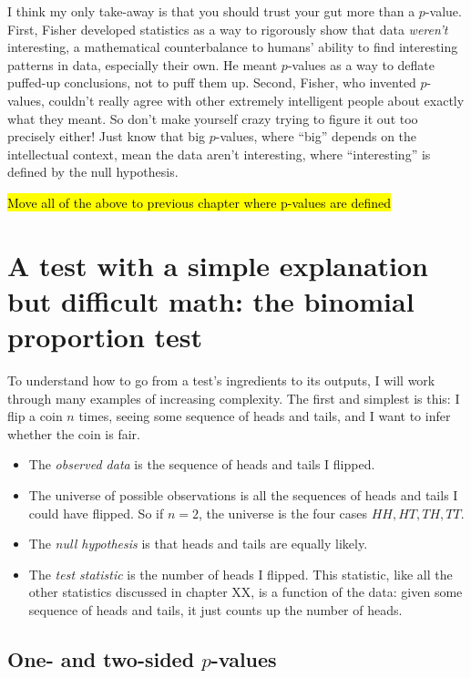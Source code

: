 I think my only take-away is that you should trust your gut more than a $p$-value. First, Fisher developed statistics as a way to rigorously show that data \emph{weren't} interesting, a mathematical counterbalance to humans' ability to find interesting patterns in data, especially their own. He meant $p$-values as a way to deflate puffed-up conclusions, not to puff them up. Second, Fisher, who invented $p$-values, couldn't really agree with other extremely intelligent people about exactly what they meant. So don't make yourself crazy trying to figure it out too precisely either! Just know that big $p$-values, where ``big'' depends on the intellectual context, mean the data aren't interesting, where ``interesting'' is defined by the null hypothesis.

\hl{Move all of the above to previous chapter where p-values are defined}

\section{A test with a simple explanation but difficult math: the binomial proportion test}

To understand how to go from a test's ingredients to its outputs, I will work
through many examples of increasing complexity. The first and simplest is this:
I flip a coin $n$ times, seeing some sequence of heads and tails, and I want to
infer whether the coin is fair.

\begin{itemize}
\item The \emph{observed data} is the sequence of heads and tails I flipped.
\item The universe of possible observations is all the sequences of heads and tails I could have flipped. So if $n=2$, the universe is the four cases $HH, HT, TH, TT$.
\item The \emph{null hypothesis} is that heads and tails are equally likely.
\item The \emph{test statistic} is the number of heads I flipped. This statistic, like all the other statistics discussed in chapter XX, is a function of the data: given some sequence of heads and tails, it just counts up the number of heads.
\end{itemize}

\subsection{One- and two-sided $p$-values}


